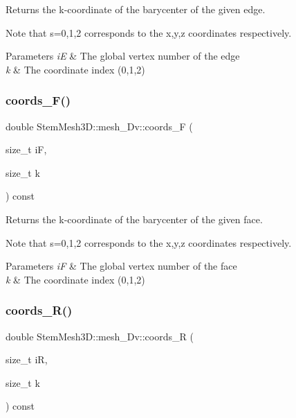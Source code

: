 Returns the k-\/coordinate of the barycenter of the given edge. 

Note that s=0,1,2 corresponds to the x,y,z coordinates respectively. 
\begin{DoxyParams}{Parameters}
{\em iE} & The global vertex number of the edge \\
\hline
{\em k} & The coordinate index (0,1,2) \\
\hline
\end{DoxyParams}
\mbox{\label{classStemMesh3D_1_1mesh__3Dv_ac7c814c45152936451a8d5da7606fb76}} 
\subsubsection{\texorpdfstring{coords\+\_\+\+F()}{coords\_F()}}
{\footnotesize\ttfamily double Stem\+Mesh3\+D\+::mesh\+\_\+Dv\+::coords\+\_\+F (\begin{DoxyParamCaption}\item[{size\+\_\+t}]{iF,  }\item[{size\+\_\+t}]{k }\end{DoxyParamCaption}) const}



Returns the k-\/coordinate of the barycenter of the given face. 

Note that s=0,1,2 corresponds to the x,y,z coordinates respectively. 
\begin{DoxyParams}{Parameters}
{\em iF} & The global vertex number of the face \\
\hline
{\em k} & The coordinate index (0,1,2) \\
\hline
\end{DoxyParams}
\mbox{\label{classStemMesh3D_1_1mesh__3Dv_a93c53cc79d88193b65fa5206082720e2}} 
\subsubsection{\texorpdfstring{coords\+\_\+\+R()}{coords\_R()}}
{\footnotesize\ttfamily double Stem\+Mesh3\+D\+::mesh\+\_\+Dv\+::coords\+\_\+R (\begin{DoxyParamCaption}\item[{size\+\_\+t}]{iR,  }\item[{size\+\_\+t}]{k }\end{DoxyParamCaption}) const}



